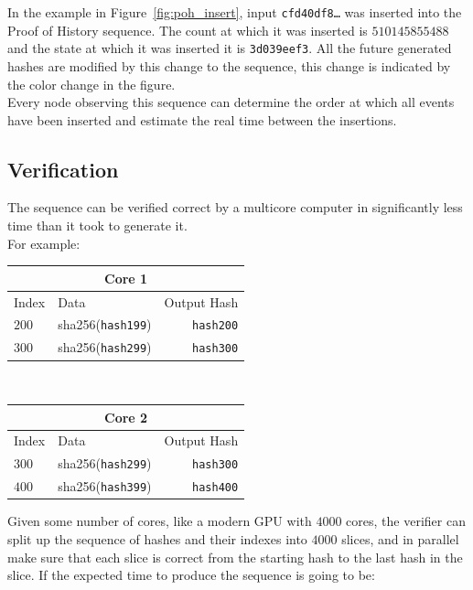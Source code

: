 \documentclass[12pt]{article}
\begin{document}
  In the example in Figure~\ref{fig:poh_insert}, input \texttt{cfd40df8\ldots} was inserted into the Proof of History sequence. The count at which it was inserted is $510145855488$ and the state at which it was inserted it is \texttt{3d039eef3}. All the future generated hashes are modified by this change to the sequence, this change is indicated by the color change in the figure.\\

Every node observing this sequence can determine the order at which all events have been inserted and estimate the real time between the insertions.

\subsection{Verification}\label{poh:verify}
The sequence can be verified correct by a multicore computer in significantly less time than it took to generate it.\\

\noindent For example: \\\noindent

\begin{center}

\begin{tabular}{l l r}
    \multicolumn{3}{c}{Core 1} \\ \hline
    Index & Data & Output Hash \\ \hline
    $200$ & sha256(\texttt{hash199}) & \texttt{hash200} \\
    $300$ & sha256(\texttt{hash299}) & \texttt{hash300}\\
    \end{tabular}\\

  \begin{tabular}{l l r}
    \multicolumn{3}{c}{Core 2} \\
    \hline
    Index & Data & Output Hash \\ \hline
    $300$ & sha256(\texttt{hash299}) & \texttt{hash300} \\
    $400$ & sha256(\texttt{hash399}) & \texttt{hash400}\\
    \end{tabular}

\end{center}


Given some number of cores, like a modern GPU with $4000$ cores, the verifier can split up the sequence of hashes and their indexes into $4000$ slices, and in parallel make sure that each slice is correct from the starting hash to the last hash in the slice. If the expected time to produce the sequence is going to be:\\
\end{document}
